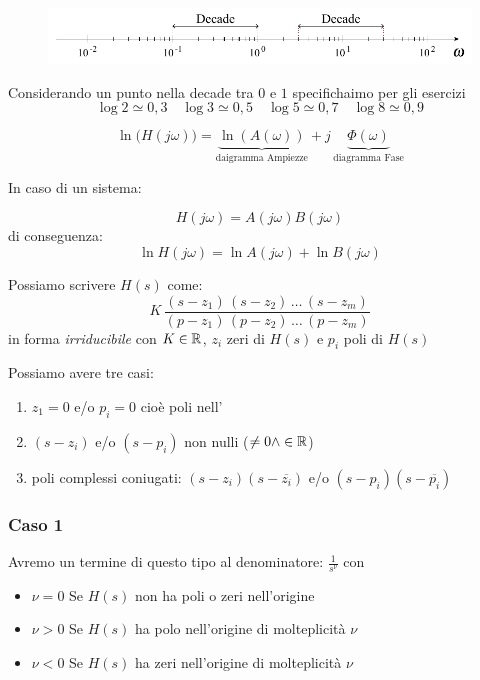 \begin{figure}[H]
	\centering
	\includegraphics[width=0.7\linewidth]{immagini/cap6_Bode/decade.pdf}
	\label{fig:schDecade}
\end{figure}
Considerando un punto nella decade tra $ 0 $ e $ 1 $ specifichaimo per gli esercizi
\[ 
	\log 2 \simeq 0,3 \quad \log 3 \simeq 0,5 \quad\log 5 \simeq 0,7 \quad\log 8 \simeq 0,9 
 \]

\[ 
	\ln \big(H(j\omega)\big) = \underbrace{\ln (A(\omega))}_{\text{daigramma Ampiezze}} + j\,\underbrace{\Phi (\omega)}_{\text{diagramma Fase}}
 \]
 
 In caso di un sistema:
\begin{center}
	
\end{center}

\[ 
	H(j \omega)=A(j \omega)B(j \omega)
 \]
 di conseguenza: 
 \[ 
	\ln H(j \omega)=\ln A(j \omega) + \ln B(j \omega)
 \]
 
 
 
 Possiamo scrivere $ H(s) $ come:
 \[  
 	K \, \frac{(s-z_1)\,(s-z_2)\,\dots \,(s-z_m)}{(p-z_1)\,(p-z_2)\,\dots \,(p-z_m)}
 \]
 in forma \emph{irriducibile} con $K \in \mathbb{R}  $, $ z_i $ zeri di $ H(s) $ e $ p_i $ poli di $ H(s) $
 
 Possiamo avere tre casi:
 \begin{enumerate}
 	\item $ z_1=0 $ e/o $ p_i = 0 $ cioè poli nell' 
 	\item $ (s-z_i) $ e/o $ (s-p_i) $ non nulli ($ \ne 0  \wedge \in \mathbb{R}$)
 	\item poli complessi coniugati: $ (s-z_i)(s-\overline{z_i}) $ e/o  $ (s-p_i)(s-\overline{p_i}) $
 \end{enumerate}

\subsubsection{Caso 1}
Avremo un termine di questo tipo al denominatore:
 $ \frac{1}{s^\nu}  $
con 
\begin{itemize}
	\item $ \nu =0 $ Se $ H(s) $ non ha poli o zeri nell'origine
	\item $ \nu >0 $ Se $ H(s) $ ha polo nell'origine di molteplicità $ \nu $
	\item $ \nu <0 $ Se $ H(s) $ ha zeri nell'origine di molteplicità $\nu$
\end{itemize}

